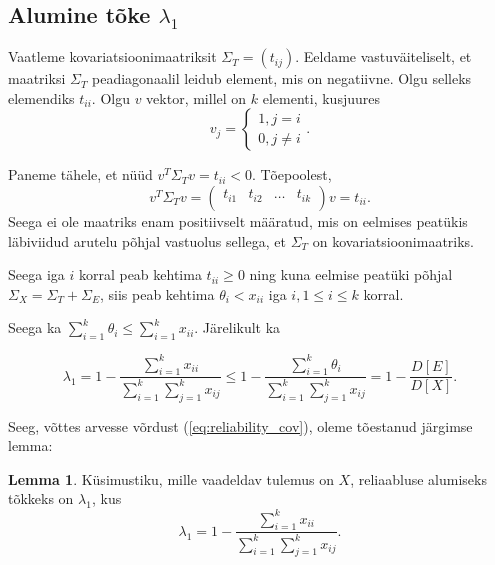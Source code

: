 \documentclass[a4paper,12pt,oneside]{article}
\newcounter{lemma}[section]
\numberwithin{equation}{section}
\theoremstyle{definition}
\newtheorem{lambda_1}[lemma]{Lemma}
\begin{document}
\subsection{Alumine tõke $\lambda_1$}

Vaatleme kovariatsioonimaatriksit $\Sigma_T=(t_{ij})$. Eeldame vastuväiteliselt, et maatriksi $\Sigma_T$ peadiagonaalil leidub element, mis on negatiivne. Olgu selleks elemendiks  $t_{ii}$. Olgu $v$ vektor, millel on $k$ elementi, kusjuures 
\begin{equation*}
v_j =
\begin{cases}
1, j = i \\
0, j \neq i
\end{cases} 
\text{.}
\end{equation*} 

Paneme tähele, et n\"u\"ud $v^T \Sigma_T v = t_{ii} < 0$. Tõepoolest,
\begin{equation*}
v^T \Sigma_T v = 
\begin{pmatrix}
t_{i1} & t_{i2} &  \hdots & t_{ik}\\
\end{pmatrix} v = t_{ii} \text{.}
\end{equation*} Seega ei ole maatriks enam positiivselt määratud, mis on eelmises peatükis läbi\-viidud arutelu põhjal vastuolus sellega, et $\Sigma_T$ on kovariatsioonimaatriks.

Seega iga $i$ korral peab kehtima $t_{ii} \geq 0$ ning kuna eelmise peatüki põhjal $\Sigma_X = \Sigma_T + \Sigma_E$, siis peab kehtima $\theta_i < x_{ii}$ iga $i, 1 \leq i \leq k$ korral.

Seega ka $\sum \limits_{i=1}^k \theta_i \leq \sum \limits_{i=1}^k x_{ii}$. 
Järelikult ka

\begin{equation}
\label{eq:lambda_1}
\lambda_1 = 1 - \frac{ \sum \limits_{i=1}^k {x}_{ii}}{ \sum \limits_{i=1}^k \sum \limits_{j=1}^k {x}_{ij}} \leq  1 - \frac{ \sum \limits_{i=1}^k  {\theta}_{i}}{ \sum \limits_{i=1}^k \sum \limits_{j=1}^k {x}_{ij}} =  1 - \frac{D \left[ E \right]}{D \left[ X \right]}.
\end{equation} 

Seeg, võttes arvesse võrdust (\ref{eq:reliability_cov}), oleme tõestanud järgimse lemma:


\vspace{10pt}


\begin{lambda_1}
Küsimustiku, mille vaadeldav tulemus on $X$, reliaabluse alumiseks tõkkeks on $\lambda_1$, kus
\begin{equation*}
\lambda_1 = 1 - \frac{ \sum \limits_{i=1}^k {x}_{ii}}{ \sum \limits_{i=1}^k \sum \limits_{j=1}^k {x}_{ij}} \text{.}
\end{equation*} 
\end{lambda_1}
\end{document}
